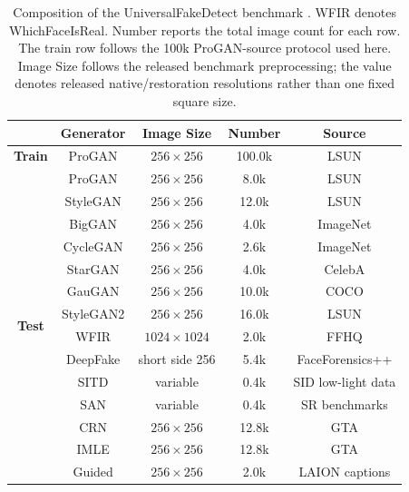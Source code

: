 \documentclass[letterpaper,journal]{IEEEtran}
\begin{document}
\begin{table}[!t]
\caption{Composition of the UniversalFakeDetect benchmark \cite{ojha2023univfd,wang2020cnnspot}. WFIR denotes WhichFaceIsReal. Number reports the total image count for each row. The train row follows the 100k ProGAN-source protocol used here. Image Size follows the released benchmark preprocessing; the value denotes released native/restoration resolutions rather than one fixed square size.}
\label{tab:appendix_ufd_statistics}
\centering
\small
\renewcommand{\arraystretch}{1.02}
\setlength{\tabcolsep}{1pt}
\begin{tabular}{@{}c|cccc@{}}
\toprule
& \textbf{Generator} & \textbf{Image Size} & \textbf{Number} & \textbf{Source} \\
\midrule
\textbf{Train} & ProGAN \cite{karras2018progan} & $256\times256$ & 100.0k & LSUN \cite{yu2015lsun} \\
\midrule
\multirow{21}{*}{\textbf{Test}}
& ProGAN & $256\times256$ & 8.0k & LSUN \\
& StyleGAN \cite{karras2019stylegan} & $256\times256$ & 12.0k & LSUN \\
& BigGAN \cite{brock2019biggan} & $256\times256$ & 4.0k & ImageNet \cite{deng2009imagenet} \\
& CycleGAN \cite{zhu2017cyclegan} & $256\times256$ & 2.6k & ImageNet \\
& StarGAN \cite{choi2018stargan} & $256\times256$ & 4.0k & CelebA \cite{liu2015celeba} \\
& GauGAN \cite{park2019spade} & $256\times256$ & 10.0k & COCO \cite{lin2014coco} \\
& StyleGAN2 \cite{karras2020stylegan2} & $256\times256$ & 16.0k & LSUN \\
& WFIR \cite{whichfaceisreal2023} & $1024\times1024$ & 2.0k & FFHQ \cite{karras2019stylegan} \\
& DeepFake & short side 256 & 5.4k & FaceForensics++ \cite{rossler2019faceforensics} \\
& SITD \cite{chen2018sid} & variable & 0.4k & SID low-light data \\
& SAN \cite{dai2019san} & variable & 0.4k & SR benchmarks \\
& CRN \cite{chen2017crn} & $256\times256$ & 12.8k & GTA \cite{richter2016playing} \\
& IMLE \cite{li2019imle} & $256\times256$ & 12.8k & GTA \\
& Guided \cite{dhariwal2021diffusion} & $256\times256$ & 2.0k & LAION captions \cite{schuhmann2021laion400m} \\

\end{tabular}
\end{table}
\end{document}
